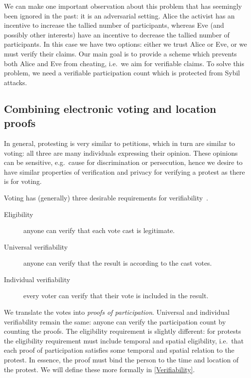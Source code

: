 We can make one important observation about this problem that has seemingly 
been ignored in the past: it is an adversarial setting.
Alice the activist has an incentive to increase the tallied number of 
participants, whereas Eve (and possibly other interests) have an incentive to 
decrease the tallied number of participants.
In this case we have two options:
either we trust Alice or Eve, or we must verify their claims.
Our main goal is to provide a scheme which prevents both Alice and Eve from 
cheating, i.e.\ we aim for verifiable claims.
To solve this problem, we need a verifiable participation count which is 
protected from Sybil attacks.

\subsection{Combining electronic voting and location proofs}

In general, protesting is very similar to petitions, which in turn are similar 
to voting: all three are many individuals expressing their opinion.
These opinions can be sensitive, e.g.\ cause for discrimination or persecution, 
hence we desire to have similar properties of verification and privacy for 
verifying a protest as there is for voting.

Voting has (generally) three desirable requirements for 
verifiability~\cite{VerifyingPrivacyPropertiesOfVotingProtocols}.
\begin{frame}
\begin{description}
  \item[Eligibility] anyone can verify that each vote cast is legitimate.
  \item[Universal verifiability] anyone can verify that the result is according 
    to the cast votes.
  \item[Individual verifiability] every voter can verify that their vote is 
    included in the result.
\end{description}
\end{frame}
We translate the votes into \emph{proofs of participation}.
Universal and individual verifiability remain the same: anyone can verify the 
participation count by counting the proofs.
The eligibility requirement is slightly different:
for protests the eligibility requirement must include temporal and spatial 
eligibility, i.e.\ that each proof of participation satisfies some temporal and 
spatial relation to the protest.
In essence, the proof must bind the person to the time and location of the 
protest.
We will define these more formally in \cref{Verifiability}.

